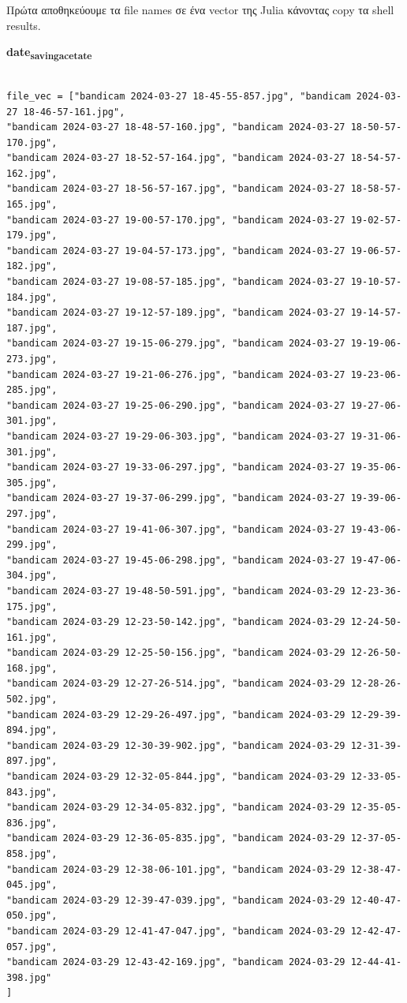 \documentclass[11pt]{article}
\begin{document}
Πρώτα αποθηκεύουμε τα file names σε ένα vector της Julia κάνοντας copy τα shell results.

\textbf{date\textsubscript{saving}\textsubscript{acetate}}
\begin{verbatim}

file_vec = ["bandicam 2024-03-27 18-45-55-857.jpg", "bandicam 2024-03-27 18-46-57-161.jpg",
"bandicam 2024-03-27 18-48-57-160.jpg", "bandicam 2024-03-27 18-50-57-170.jpg",
"bandicam 2024-03-27 18-52-57-164.jpg", "bandicam 2024-03-27 18-54-57-162.jpg",
"bandicam 2024-03-27 18-56-57-167.jpg", "bandicam 2024-03-27 18-58-57-165.jpg",
"bandicam 2024-03-27 19-00-57-170.jpg", "bandicam 2024-03-27 19-02-57-179.jpg",
"bandicam 2024-03-27 19-04-57-173.jpg", "bandicam 2024-03-27 19-06-57-182.jpg",
"bandicam 2024-03-27 19-08-57-185.jpg", "bandicam 2024-03-27 19-10-57-184.jpg",
"bandicam 2024-03-27 19-12-57-189.jpg", "bandicam 2024-03-27 19-14-57-187.jpg",
"bandicam 2024-03-27 19-15-06-279.jpg", "bandicam 2024-03-27 19-19-06-273.jpg",
"bandicam 2024-03-27 19-21-06-276.jpg", "bandicam 2024-03-27 19-23-06-285.jpg",
"bandicam 2024-03-27 19-25-06-290.jpg", "bandicam 2024-03-27 19-27-06-301.jpg",
"bandicam 2024-03-27 19-29-06-303.jpg", "bandicam 2024-03-27 19-31-06-301.jpg",
"bandicam 2024-03-27 19-33-06-297.jpg", "bandicam 2024-03-27 19-35-06-305.jpg",
"bandicam 2024-03-27 19-37-06-299.jpg", "bandicam 2024-03-27 19-39-06-297.jpg",
"bandicam 2024-03-27 19-41-06-307.jpg", "bandicam 2024-03-27 19-43-06-299.jpg",
"bandicam 2024-03-27 19-45-06-298.jpg", "bandicam 2024-03-27 19-47-06-304.jpg",
"bandicam 2024-03-27 19-48-50-591.jpg", "bandicam 2024-03-29 12-23-36-175.jpg",
"bandicam 2024-03-29 12-23-50-142.jpg", "bandicam 2024-03-29 12-24-50-161.jpg",
"bandicam 2024-03-29 12-25-50-156.jpg", "bandicam 2024-03-29 12-26-50-168.jpg",
"bandicam 2024-03-29 12-27-26-514.jpg", "bandicam 2024-03-29 12-28-26-502.jpg",
"bandicam 2024-03-29 12-29-26-497.jpg", "bandicam 2024-03-29 12-29-39-894.jpg",
"bandicam 2024-03-29 12-30-39-902.jpg", "bandicam 2024-03-29 12-31-39-897.jpg",
"bandicam 2024-03-29 12-32-05-844.jpg", "bandicam 2024-03-29 12-33-05-843.jpg",
"bandicam 2024-03-29 12-34-05-832.jpg", "bandicam 2024-03-29 12-35-05-836.jpg",
"bandicam 2024-03-29 12-36-05-835.jpg", "bandicam 2024-03-29 12-37-05-858.jpg",
"bandicam 2024-03-29 12-38-06-101.jpg", "bandicam 2024-03-29 12-38-47-045.jpg",
"bandicam 2024-03-29 12-39-47-039.jpg", "bandicam 2024-03-29 12-40-47-050.jpg",
"bandicam 2024-03-29 12-41-47-047.jpg", "bandicam 2024-03-29 12-42-47-057.jpg",
"bandicam 2024-03-29 12-43-42-169.jpg", "bandicam 2024-03-29 12-44-41-398.jpg"
]

\end{verbatim}
\end{document}

